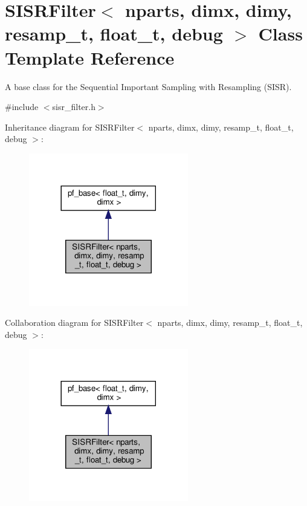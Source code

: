 \hypertarget{classSISRFilter}{}\section{S\+I\+S\+R\+Filter$<$ nparts, dimx, dimy, resamp\+\_\+t, float\+\_\+t, debug $>$ Class Template Reference}
\label{classSISRFilter}


A base class for the Sequential Important Sampling with Resampling (S\+I\+SR).  




{\ttfamily \#include $<$sisr\+\_\+filter.\+h$>$}



Inheritance diagram for S\+I\+S\+R\+Filter$<$ nparts, dimx, dimy, resamp\+\_\+t, float\+\_\+t, debug $>$\+:\nopagebreak
\begin{figure}[H]
\begin{center}
\leavevmode
\includegraphics[width=197pt]{classSISRFilter__inherit__graph}
\end{center}
\end{figure}


Collaboration diagram for S\+I\+S\+R\+Filter$<$ nparts, dimx, dimy, resamp\+\_\+t, float\+\_\+t, debug $>$\+:\nopagebreak
\begin{figure}[H]
\begin{center}
\leavevmode
\includegraphics[width=197pt]{classSISRFilter__coll__graph}
\end{center}
\end{figure}
